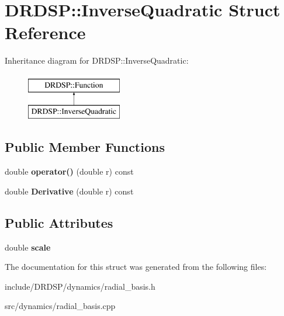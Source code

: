\hypertarget{struct_d_r_d_s_p_1_1_inverse_quadratic}{\section{D\-R\-D\-S\-P\-:\-:Inverse\-Quadratic Struct Reference}
\label{struct_d_r_d_s_p_1_1_inverse_quadratic}
}
Inheritance diagram for D\-R\-D\-S\-P\-:\-:Inverse\-Quadratic\-:\begin{figure}[H]
\begin{center}
\leavevmode
\includegraphics[height=2.000000cm]{struct_d_r_d_s_p_1_1_inverse_quadratic}
\end{center}
\end{figure}
\subsection*{Public Member Functions}
\begin{DoxyCompactItemize}
\item 
\hypertarget{struct_d_r_d_s_p_1_1_inverse_quadratic_a8046e278ab0c485750ff062c6862ec87}{double {\bfseries operator()} (double r) const }\label{struct_d_r_d_s_p_1_1_inverse_quadratic_a8046e278ab0c485750ff062c6862ec87}

\item 
\hypertarget{struct_d_r_d_s_p_1_1_inverse_quadratic_a628c78a421c55898e94846eeb1865326}{double {\bfseries Derivative} (double r) const }\label{struct_d_r_d_s_p_1_1_inverse_quadratic_a628c78a421c55898e94846eeb1865326}

\end{DoxyCompactItemize}
\subsection*{Public Attributes}
\begin{DoxyCompactItemize}
\item 
\hypertarget{struct_d_r_d_s_p_1_1_inverse_quadratic_a31241ecd1ec571b651307d29e6b69c07}{double {\bfseries scale}}\label{struct_d_r_d_s_p_1_1_inverse_quadratic_a31241ecd1ec571b651307d29e6b69c07}

\end{DoxyCompactItemize}


The documentation for this struct was generated from the following files\-:\begin{DoxyCompactItemize}
\item 
include/\-D\-R\-D\-S\-P/dynamics/radial\-\_\-basis.\-h\item 
src/dynamics/radial\-\_\-basis.\-cpp\end{DoxyCompactItemize}
